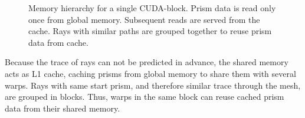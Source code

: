 \begin{figure}[H]
  \centerline
      {}
  \caption{Memory hierarchy for a single CUDA-block. Prism data is
    read only once from global memory. Subsequent reads are served
    from the cache. Rays with similar paths are grouped together to
    reuse prism data from cache.}
  \label{graphic:memory_hierarchy}
\end{figure}
Because the trace of rays can not be predicted in advance, the shared
memory acts as L1 cache, caching prisms from global memory to share
them with several warps.  Rays with same start prism, and therefore
similar trace through the mesh, are grouped in blocks. Thus, warps in
the same block can reuse cached prism data from their shared memory.

